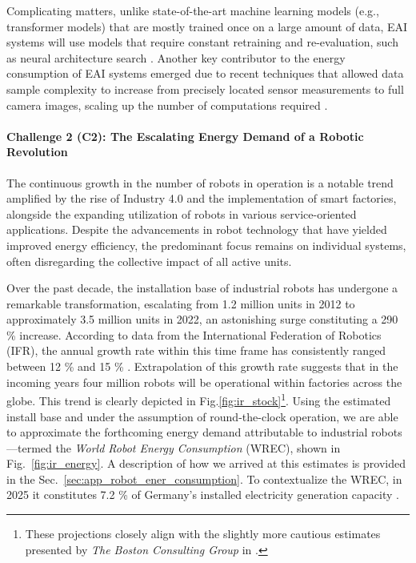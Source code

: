 \documentclass[12pt]{article}
\begin{document}
Complicating matters, unlike state-of-the-art machine learning models (e.g., transformer models) that are mostly trained once on a large amount of data, EAI systems will use models that require constant retraining and re-evaluation, such as neural architecture search \cite{real2019regularized}. Another key contributor to the energy consumption of EAI systems emerged due to recent techniques that allowed data sample complexity to increase from precisely located sensor measurements to full camera images, scaling up the number of computations required \cite{krizhevsky2012imagenet}. 


\paragraph*{\textbf{Challenge 2} (C2): The Escalating Energy Demand of a Robotic Revolution}\label{sec:robots_challenge}
The continuous growth in the number of robots in operation is a notable trend amplified by the rise of Industry 4.0 and the implementation of smart factories, alongside the expanding utilization of robots in various service-oriented applications. Despite the advancements in robot technology that have yielded improved energy efficiency, the predominant focus remains on individual systems, often disregarding the collective impact of all active units.

Over the past decade, the installation base of industrial robots has undergone a remarkable transformation, escalating from 1.2 million units in 2012 to approximately 3.5 million units in 2022, an astonishing surge constituting a 290 \% increase. According to data from the International Federation of Robotics (IFR), the annual growth rate within this time frame has consistently ranged between 12 \% and 15 \% \cite{IFR2019}. Extrapolation of this growth rate suggests that in the incoming years four million robots will be operational within factories across the globe. This trend is clearly depicted in Fig.\ref{fig:ir_stock}\footnote{These projections closely align with the slightly more cautious estimates presented by \textit{The Boston Consulting Group} in \cite{sirkin2015}.}. Using the estimated install base and under the assumption of round-the-clock operation, we are able to approximate the forthcoming energy demand attributable to industrial robots---termed the \textit{World Robot Energy Consumption} (WREC), shown in Fig.~\ref{fig:ir_energy}. A description of how we arrived at this estimates is provided in the  Sec.~\ref{sec:app_robot_ener_consumption}. To contextualize the WREC, in 2025 it constitutes 7.2 \% of Germany's installed electricity generation capacity \cite{fraunhofer2016}.
\end{document}

